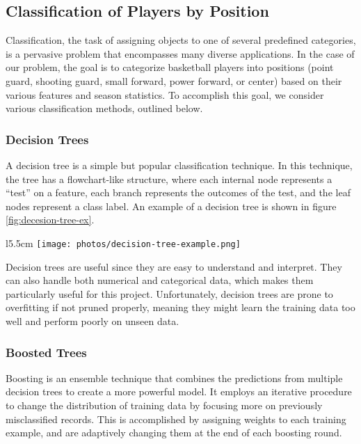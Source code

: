 \documentclass[./main.tex]{subfiles}
\begin{document}
\subsection{Classification of Players by Position} \label{subsec:classify}
Classification, the task of assigning objects to one of several predefined categories, is a pervasive problem that encompasses many diverse applications. In the case of our problem, the goal is to categorize basketball players into positions (point guard, shooting guard, small forward, power forward, or center) based on their various features and season statistics. To accomplish this goal, we consider various classification methods, outlined below.

\subsubsection{Decision Trees}
A decision tree is a simple but popular classification technique. In this technique, the tree has a flowchart-like structure, where each internal node represents a ``test'' on a feature, each branch represents the outcomes of the test, and the leaf nodes represent a class label. An example of a decision tree is shown in figure \ref{fig:decesion-tree-ex}.

\begin{wrapfigure}{l}{5.5cm}
    \centering
    \texttt{[image: photos/decision-tree-example.png]}
    \caption{An example of a decision tree for classifying mammals.}
    \label{fig:decesion-tree-ex}
\end{wrapfigure}

Decision trees are useful since they are easy to understand and interpret. They can also handle both numerical and categorical data, which makes them particularly useful for this project. Unfortunately, decision trees are prone to overfitting if not pruned properly, meaning they might learn the training data too well and perform poorly on unseen data. 

\subsubsection{Boosted Trees}
Boosting is an ensemble technique that combines the predictions from multiple decision trees to create a more powerful model. It employs an iterative procedure to change the distribution of training data by focusing more on previously misclassified records. This is accomplished by assigning weights to each training example, and are adaptively changing them at the end of each boosting round.
\end{document}
